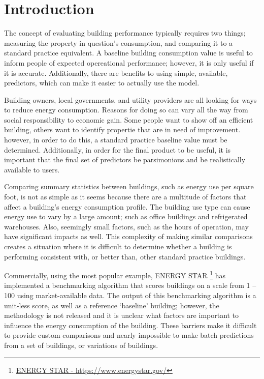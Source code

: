 \section*{Introduction}
\label{sec:introduction}

The concept of evaluating building performance typically requires two things; measuring the property in question's consumption, and comparing it to a standard practice equivalent.  A baseline building consumption value is useful to inform people of expected opereational performance; however, it is only useful if it is accurate.  Additionally, there are benefits to using simple, available, predictors, which can make it easier to actually use the model.

Building owners, local governments, and utility providers are all looking for ways to reduce energy consumption.  Reasons for doing so can vary all the way from social responsibility to economic gain.  Some people want to show off an efficient building, others want to identify propertie that are in need of improvement.  however, in order to do this, a standard practice baseline value must be determined.  Additionally, in order for the final product to be useful, it is important that the final set of predictors be parsimonious and be realistically available to users.

Comparing summary statistics between buildings, such as energy use per square foot, is not as simple as it seems because there are a multitude of factors that affect a building’s energy consumption profile.  The building use type can cause energy use to vary by a large amount; such as office buildings and refrigerated warehouses.  Also, seemingly small factors, such as the hours of operation, may have significant impacts as well.  This complexity of making similar comparisons creates a situation where it is difficult to determine whether a building is performing consistent with, or better than, other standard practice buildings.

Commercially, using the most popular example, ENERGY STAR \footnote{\href{https://www.energystar.gov/}{ENERGY STAR - \url{https://www.energystar.gov/}}} has implemented a benchmarking algorithm that scores buildings on a scale from 1 – 100 using market-available data.  The output of this benchmarking algorithm is a unit-less score, as well as a reference ‘baseline’ building; however, the methodology is not released and it is unclear what factors are important to influence the energy consumption of the building.  These barriers make it difficult to provide custom comparisons and nearly impossible to make batch predictions from a set of buildings, or variations of buildings.

